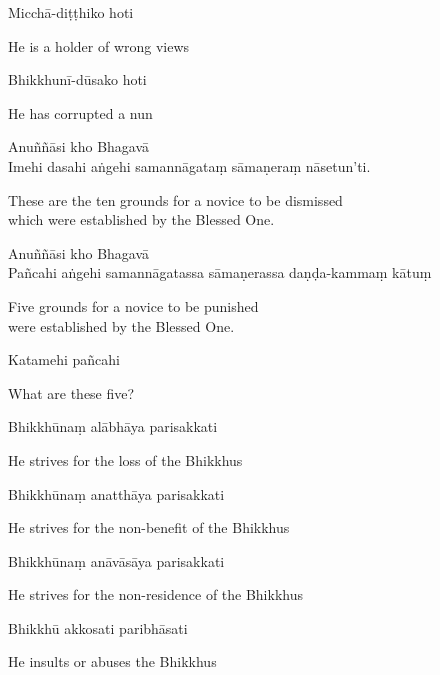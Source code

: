Micchā-diṭṭhiko hoti

\begin{english}
  He is a holder of wrong views
\end{english}

Bhikkhunī-dūsako hoti

\begin{english}
  He has corrupted a nun
\end{english}

Anuññāsi kho Bhagavā\\
Imehi dasahi aṅgehi samannāgataṃ sāmaṇeraṃ nāsetun'ti.

\begin{english}
  These are the ten grounds for a novice to be dismissed\\
  which were established by the Blessed One.
\end{english}


Anuññāsi kho Bhagavā\\
Pañcahi aṅgehi samannāgatassa sāmaṇerassa daṇḍa-kammaṃ kātuṃ

\begin{english}
  Five grounds for a novice to be punished\\
  were established by the Blessed One.
\end{english}

Katamehi pañcahi

\begin{english}
  What are these five?
\end{english}

Bhikkhūnaṃ alābhāya parisakkati

\begin{english}
  He strives for the loss of the Bhikkhus
\end{english}

Bhikkhūnaṃ anatthāya parisakkati

\begin{english}
  He strives for the non-benefit of the Bhikkhus
\end{english}

Bhikkhūnaṃ anāvāsāya parisakkati

\begin{english}
  He strives for the non-residence of the Bhikkhus
\end{english}

Bhikkhū akkosati paribhāsati

\begin{english}
  He insults or abuses the Bhikkhus
\end{english}

